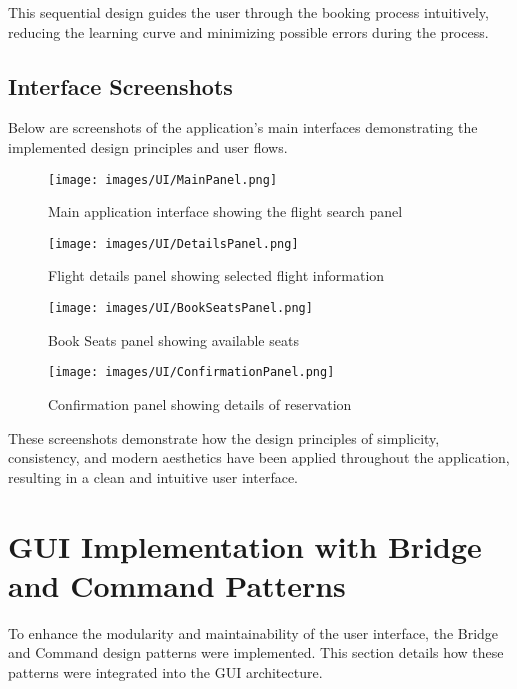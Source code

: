 \documentclass[conference]{IEEEtran}
\begin{document}
    This sequential design guides the user through the booking process intuitively, reducing the learning curve and minimizing possible errors during the process.

    \subsection{Interface Screenshots}
    Below are screenshots of the application's main interfaces demonstrating the implemented design principles and user flows.

    \begin{figure}[H]
        \centering
        \texttt{[image: images/UI/MainPanel.png]}
        \caption{Main application interface showing the flight search panel}
        \label{fig:main_interface}
    \end{figure}

    \begin{figure}[H]
        \centering
        \texttt{[image: images/UI/DetailsPanel.png]}
        \caption{Flight details panel showing selected flight information}
        \label{fig:flight_details}
    \end{figure}

    \begin{figure}[H]
        \centering
        \texttt{[image: images/UI/BookSeatsPanel.png]}
        \caption{Book Seats panel showing available seats}
        \label{fig:book_seats}
    \end{figure}
    \begin{figure}[H]
        \centering
        \texttt{[image: images/UI/ConfirmationPanel.png]}
        \caption{Confirmation panel showing details of reservation}
        \label{fig:confirm_interface}
    \end{figure}


    These screenshots demonstrate how the design principles of simplicity, consistency, and modern aesthetics have been applied throughout the application, resulting in a clean and intuitive user interface.

    \section{GUI Implementation with Bridge and Command Patterns}
    To enhance the modularity and maintainability of the user interface, the Bridge and Command design patterns were implemented. This section details how these patterns were integrated into the GUI architecture.
\end{document}
